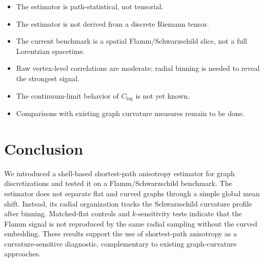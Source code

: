 \documentclass[11pt]{article}
\begin{document}
\begin{itemize}
\item The estimator is path-statistical, not tensorial.
\item The estimator is not derived from a discrete Riemann tensor.
\item The current benchmark is a spatial Flamm/Schwarzschild slice, not a full Lorentzian spacetime.
\item Raw vertex-level correlations are moderate; radial binning is needed to reveal the strongest signal.
\item The continuum-limit behavior of $C_{\log}$ is not yet known.
\item Comparisons with existing graph curvature measures remain to be done.
\end{itemize}

\section{Conclusion}

We introduced a shell-based shortest-path anisotropy estimator for graph discretizations and tested it on a Flamm/Schwarzschild benchmark. The estimator does not separate flat and curved graphs through a simple global mean shift. Instead, its radial organization tracks the Schwarzschild curvature profile after binning. Matched-flat controls and $k$-sensitivity tests indicate that the Flamm signal is not reproduced by the same radial sampling without the curved embedding. These results support the use of shortest-path anisotropy as a curvature-sensitive diagnostic, complementary to existing graph-curvature approaches.



\end{document}
